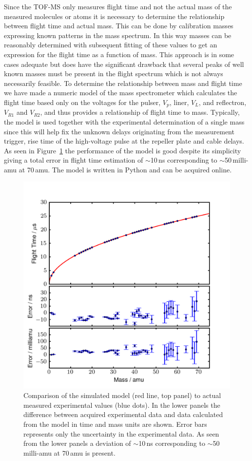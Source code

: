 \documentclass[aip,rsi]{revtex4-1}
\begin{document}
Since the TOF-MS only measures flight time and not the actual mass of the measured molecules or atoms it is necessary to determine the relationship between flight time and actual mass. This can be done by calibration masses expressing known patterns in the mass spectrum. In this way masses can be reasonably determined with subsequent fitting of these values to get an expression for the flight time as a function of mass. This approach is in some cases adequate but does have the significant drawback that several peaks of well known masses must be present in the flight spectrum which is not always necessarily feasible. To determine the relationship between mass and flight time we have made a numeric model of the mass spectrometer which calculates the flight time based only on the voltages for the pulser, $V_p$, liner, $V_L$, and reflectron, $V_{R1}$ and $V_{R2}$, and thus provides a relationship of flight time to mass. Typically, the model is used together with the experimental determination of a single mass since this will help fix the unknown delays originating from the measurement trigger, rise time of the high-voltage pulse at the repeller plate and cable delays. As seen in Figure~\ref{fig:model_error} the performance of the model is good despite its simplicity giving a total error in flight time estimation of $\sim$10\,ns corresponding to $\sim$50\,milli-amu at 70\,amu. The model is written in Python and can be acquired online\cite{ModelGithub}.
\begin{figure}
 \includegraphics[width=14cm]{model_error.png}%
 \caption{Comparison of the simulated model (red line, top panel) to actual measured experimental values (blue dots). In the lower panels the difference between acquired experimental data and data calculated from the model in time and mass units are shown. Error bars represents only the uncertainty in the experimental data. As seen from the lower panels a deviation of $\sim$10\,ns corresponding to $\sim$50\,milli-amu at 70\,amu is present.\label{fig:model_error}}%
\end{figure}
\end{document}
